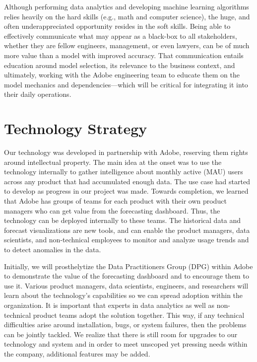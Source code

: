 \documentclass[11pt, oneside, authoryear]{report}
\begin{document}
Although performing data analytics and developing machine learning algorithms relies heavily on the hard skills (e.g., math and computer science), the huge, and often underappreciated opportunity resides in the soft skills. Being able to effectively communicate what may appear as a black-box to all stakeholders, whether they are fellow engineers, management, or even lawyers, can be of much more value than a model with improved accuracy. That communication entails education around model selection, its relevance to the business context, and ultimately, working with the Adobe engineering team to educate them on the model mechanics and dependencies---which will be critical for integrating it into their daily operations.

\section{Technology Strategy}
Our technology was developed in partnership with Adobe, reserving them rights around intellectual property. The main idea at the onset was to use the technology internally to gather intelligence about monthly active (MAU) users across any product that had accumulated enough data. The use case had started to develop as progress in our project was made. Towards completion, we learned that Adobe has groups of teams for each product with their own product managers who can get value from the forecasting dashboard. Thus, the technology can be deployed internally to these teams. The historical data and forecast visualizations are new tools, and can enable the product managers, data scientists, and non-technical employees to monitor and analyze usage trends and to detect anomalies in the data.

Initially, we will prosthelytize the Data Practitioners Group (DPG) within Adobe to demonstrate the value of the forecasting dashboard and to encourage them to use it. Various product managers, data scientists, engineers, and researchers will learn about the technology's capabilities so we can spread adoption within the organization. It is important that experts in data analytics as well as non-technical product teams adopt the solution together. This way, if any technical difficulties arise around installation, bugs, or system failures, then the problems can be jointly tackled. We realize that there is still room for upgrades to our technology and system and in order to meet unscoped yet pressing needs within the company, additional features may be added.
\end{document}
